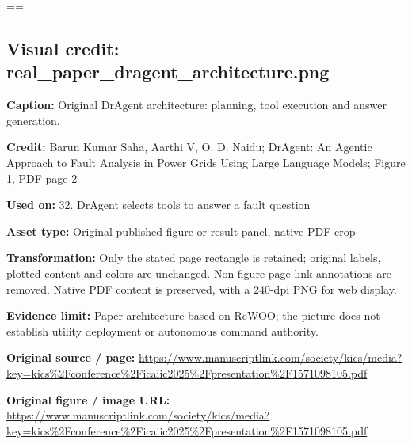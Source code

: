 \documentclass[10pt,letterpaper]{article}
\begin{document}
\egroup\par\noindent\box\readingEntry\par\medskip
\setbox\readingEntry=\vbox\bgroup\hsize=\linewidth\subsection*{Visual credit: real\_paper\_dragent\_architecture.png}
\textbf{Caption:} Original DrAgent architecture: planning, tool execution and answer generation.\par
\textbf{Credit:} Barun Kumar Saha, Aarthi V, O. D. Naidu; DrAgent: An Agentic Approach to Fault Analysis in Power Grids Using Large Language Models; Figure 1, PDF page 2\par
\textbf{Used on:} 32. DrAgent selects tools to answer a fault question\par
\textbf{Asset type:} Original published figure or result panel, native PDF crop\par
\textbf{Transformation:} Only the stated page rectangle is retained; original labels, plotted content and colors are unchanged. Non-figure page-link annotations are removed. Native PDF content is preserved, with a 240-dpi PNG for web display.\par
\textbf{Evidence limit:} Paper architecture based on ReWOO; the picture does not establish utility deployment or autonomous command authority.\par
\textbf{Original source / page:} \href{https://www.manuscriptlink.com/society/kics/media?key=kics\%2Fconference\%2Ficaiic2025\%2Fpresentation\%2F1571098105.pdf}{\small\ttfamily https:/\allowbreak{}/\allowbreak{}www.\allowbreak{}manuscriptlink.\allowbreak{}com/\allowbreak{}society/\allowbreak{}kics/\allowbreak{}media?\allowbreak{}key=\allowbreak{}kics\%\allowbreak{}2Fconference\%\allowbreak{}2Ficaiic2025\%\allowbreak{}2Fpresentation\%\allowbreak{}2F1571098105.\allowbreak{}pdf}\par
\textbf{Original figure / image URL:} \href{https://www.manuscriptlink.com/society/kics/media?key=kics\%2Fconference\%2Ficaiic2025\%2Fpresentation\%2F1571098105.pdf}{\small\ttfamily https:/\allowbreak{}/\allowbreak{}www.\allowbreak{}manuscriptlink.\allowbreak{}com/\allowbreak{}society/\allowbreak{}kics/\allowbreak{}media?\allowbreak{}key=\allowbreak{}kics\%\allowbreak{}2Fconference\%\allowbreak{}2Ficaiic2025\%\allowbreak{}2Fpresentation\%\allowbreak{}2F1571098105.\allowbreak{}pdf}\par
\egroup\par\noindent\box\readingEntry\par\medskip
\end{document}
